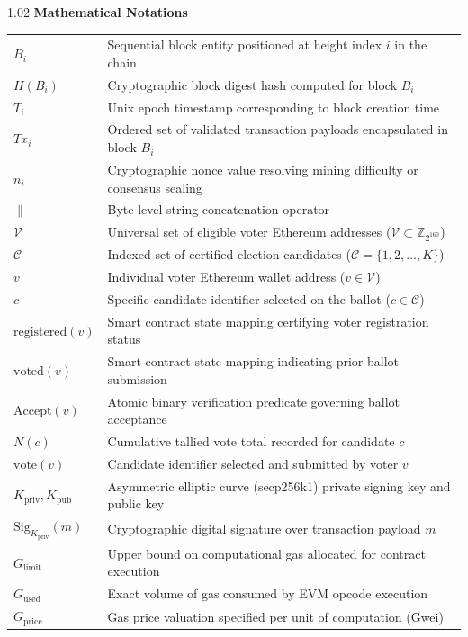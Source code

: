 \begin{spacing}{1.02}
\vspace{6pt}
\noindent \textbf{Mathematical Notations}
\nopagebreak[4]
\vspace{4pt}
\nopagebreak[4]

\noindent\begin{tabular*}{\textwidth}{@{\extracolsep{\fill}}p{2.8cm} p{11.2cm}@{}}
$B_i$ & Sequential block entity positioned at height index $i$ in the chain \\
$H(B_i)$ & Cryptographic block digest hash computed for block $B_i$ \\
$T_i$ & Unix epoch timestamp corresponding to block creation time \\
$Tx_i$ & Ordered set of validated transaction payloads encapsulated in block $B_i$ \\
$n_i$ & Cryptographic nonce value resolving mining difficulty or consensus sealing \\
$\parallel$ & Byte-level string concatenation operator \\
$\mathcal{V}$ & Universal set of eligible voter Ethereum addresses ($\mathcal{V} \subset \mathbb{Z}_{2^{160}}$) \\
$\mathcal{C}$ & Indexed set of certified election candidates ($\mathcal{C} = \{1, 2, \dots, K\}$) \\
$v$ & Individual voter Ethereum wallet address ($v \in \mathcal{V}$) \\
$c$ & Specific candidate identifier selected on the ballot ($c \in \mathcal{C}$) \\
$\text{registered}(v)$ & Smart contract state mapping certifying voter registration status \\
$\text{voted}(v)$ & Smart contract state mapping indicating prior ballot submission \\
$\text{Accept}(v)$ & Atomic binary verification predicate governing ballot acceptance \\
$N(c)$ & Cumulative tallied vote total recorded for candidate $c$ \\
$\text{vote}(v)$ & Candidate identifier selected and submitted by voter $v$ \\
$K_{\text{priv}}, K_{\text{pub}}$ & Asymmetric elliptic curve (secp256k1) private signing key and public key \\
$\text{Sig}_{K_{\text{priv}}}(m)$ & Cryptographic digital signature over transaction payload $m$ \\
$G_{\text{limit}}$ & Upper bound on computational gas allocated for contract execution \\
$G_{\text{used}}$ & Exact volume of gas consumed by EVM opcode execution \\
$G_{\text{price}}$ & Gas price valuation specified per unit of computation (Gwei) \\
\end{tabular*}
\end{spacing}

\thispagestyle{plain}
